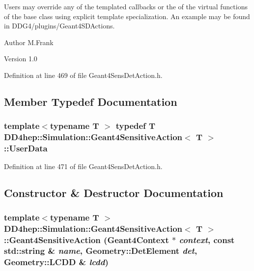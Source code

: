 Users may override any of the templated callbacks or the of the virtual functions of the base class using explicit template specialization. An example may be found in DDG4/plugins/Geant4SDActions.

\begin{DoxyAuthor}{Author}
M.Frank 
\end{DoxyAuthor}
\begin{DoxyVersion}{Version}
1.0 
\end{DoxyVersion}


Definition at line 469 of file Geant4SensDetAction.h.

\subsection{Member Typedef Documentation}
\hypertarget{class_d_d4hep_1_1_simulation_1_1_geant4_sensitive_action_a1aa349c02363cf7471a043ad5f3b95c9}{
\subsubsection[{UserData}]{\setlength{\rightskip}{0pt plus 5cm}template$<$typename T $>$ typedef T {\bf DD4hep::Simulation::Geant4SensitiveAction}$<$ T $>$::{\bf UserData}}}
\label{class_d_d4hep_1_1_simulation_1_1_geant4_sensitive_action_a1aa349c02363cf7471a043ad5f3b95c9}


Definition at line 471 of file Geant4SensDetAction.h.

\subsection{Constructor \& Destructor Documentation}
\hypertarget{class_d_d4hep_1_1_simulation_1_1_geant4_sensitive_action_ae1ede070242c666b523a1bb28a19a8f5}{
\subsubsection[{Geant4SensitiveAction}]{\setlength{\rightskip}{0pt plus 5cm}template$<$typename T $>$ {\bf DD4hep::Simulation::Geant4SensitiveAction}$<$ T $>$::{\bf Geant4SensitiveAction} ({\bf Geant4Context} $\ast$ {\em context}, \/  const std::string \& {\em name}, \/  {\bf Geometry::DetElement} {\em det}, \/  {\bf Geometry::LCDD} \& {\em lcdd})}}
\label{class_d_d4hep_1_1_simulation_1_1_geant4_sensitive_action_ae1ede070242c666b523a1bb28a19a8f5}


